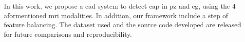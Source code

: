 
In this work, we propose a \ac{cad} system to detect \ac{cap} in
\ac{pz} and \ac{cg}, using the 4 aformentioned \ac{mri}
modalities.
In addition, our framework include a step of feature balancing.
The dataset used and the source code developed are released for future
comparisons and reproducibility.
